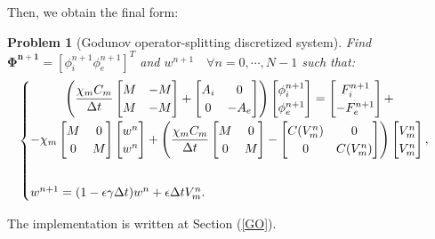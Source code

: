 \documentclass[a4paper,11pt]{article}
\newtheorem{problem}{Problem}
\begin{document}
\noindent Then, we obtain the final form:
\begin{problem}[Godunov operator-splitting discretized system] 
	Find $\bm{\Phi^{n+1}}=[\phi_i^{n+1} \phi_e^{n+1}]^T$ and $w^{n+1} \quad \forall n=0, \cdots, N-1$ such that: 
\begin{equation*}
\begin{cases}
\begin{gathered}
\left(
\frac{\chi_m C_m}{\Delta t} \begin{bmatrix}M & -M \\ M & -M\end{bmatrix}
+ \begin{bmatrix} A_i & 0 \\ 0 & -A_e \end{bmatrix}
\right) \begin{bmatrix} \phi_i^{n+1} \\ \phi_e^{n+1}  \end{bmatrix} =
\begin{bmatrix} F_i^{n+1} \\ -F_e^{n+1} \end{bmatrix} + \\ -
\chi_m\begin{bmatrix} M & 0 \\ 0 & M \end{bmatrix} \begin{bmatrix} w^n \\ w^n \end{bmatrix} +
\left(\frac{\chi_mC_m}{\Delta t}\begin{bmatrix} M & 0 \\ 0 & M \end{bmatrix}
- \begin{bmatrix} C(V_m^n) & 0 \\ 0 & C(V_m^n)\end{bmatrix} 
\right) \begin{bmatrix} V_m^n \\ V_m^n \end {bmatrix},
\end{gathered} \vspace{2mm}\\ \\
w^{n+1} = (1-\epsilon \gamma \Delta t) w^n + \epsilon \Delta tV_m^n.
\end{cases}
\end{equation*}
\end{problem}\vspace{4mm}
\noindent The implementation is written at Section (\ref{GO}).
\end{document}
